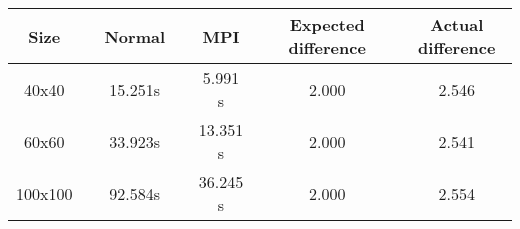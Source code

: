 \begin{center}
\label{tab:degree-l-a}
\begin{tabularx}{\textwidth}{c X c X c X c X c}
    \hline
    \hline
        Size && Normal && MPI && Expected difference && Actual difference\\
    \hline
        40x40   	&&      15.251s	&&		5.991 s 	&&	2.000	&&	2.546	\\
        60x60   	&&      33.923s	&&		13.351 s	&&	2.000	&&	2.541	\\
        100x100   	&&      92.584s	&&		36.245 s	&&	2.000	&&	2.554	\\
    \hline
\end{tabularx}
\end{center}
